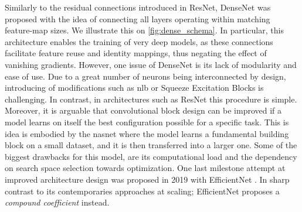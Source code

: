 \noindent Similarly to the residual connections introduced in ResNet, DenseNet 
\autocite{huang2017densely} was proposed with the idea of connecting all layers operating within 
matching feature-map sizes. We illustrate this on \autoref{fig:dense_schema}. In particular, this 
architecture enables the training of very deep models, as these connections facilitate feature reuse 
and identity mappings, thus negating the effect of vanishing gradients. However, one issue of 
DenseNet is its lack of  modularity and ease of use. Due to a great number of 
neurons being interconnected by design, introducing of modifications such as \gls{nlb} 
\autocite{wang2018non} or Squeeze Excitation Blocks  \autocite{hu2018squeeze} is challenging. In 
contrast, in architectures such as ResNet this procedure is simple.\\


\noindent Moreover, it is arguable that convolutional block design can be improved if a model 
learns on itself the best configuration possible for a specific task. This is idea is embodied by 
the \gls{nasnet} \autocite{zoph2018learning} where the model learns a fundamental building block on a 
small dataset, and it is then transferred into a larger one. Some of the biggest drawbacks for this 
model, are its computational load and the dependency on search space selection towards 
optimization. One last milestone attempt at improved architecture design was proposed in 2019 with 
EfficientNet \autocite{tan2019efficientnet}. In sharp contrast to its contemporaries approaches at 
scaling; EfficientNet proposes a \emph{compound coefficient} instead.\\

